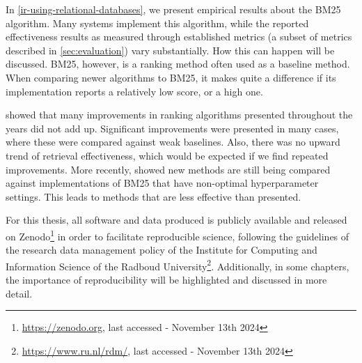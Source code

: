 In \cref{ir-using-relational-databases}, we present empirical results about the BM25 algorithm. Many systems implement this algorithm, while the reported effectiveness results as measured through established metrics (a subset of metrics described in \cref{sec:evaluation}) vary substantially. How this can happen will be discussed. BM25, however, is a ranking method often used as a baseline method. When comparing newer algorithms to BM25, it makes quite a difference if its implementation reports a relatively low score, or a high one. 

 showed that many improvements in ranking algorithms presented throughout the years did not add up. Significant improvements were presented in many cases, where these were compared against weak baselines. Also, there was no upward trend of retrieval effectiveness, which would be expected if we find repeated improvements. More recently, \citet{weak-baselines} showed new methods are still being compared against implementations of BM25 that have non-optimal hyperparameter settings. This leads to methods that are less effective than presented. 

For this thesis, all software and data produced is publicly available and released on Zenodo\footnote{\url{https://zenodo.org}, last accessed - November 13th 2024} in order to facilitate reproducible science, following the guidelines of the research data management policy of the Institute for Computing and Information Science of the Radboud University\footnote{\url{https://www.ru.nl/rdm/}, last accessed - November 13th 2024 }. Additionally, in some chapters, the importance of reproducibility will be highlighted and discussed in more detail.  